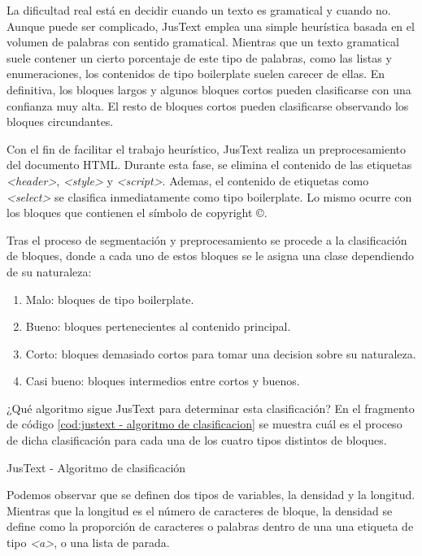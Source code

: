 La dificultad real está en decidir cuando un texto es gramatical y cuando no. Aunque puede ser complicado,
JusText emplea una simple heurística basada en el volumen de palabras con sentido gramatical. Mientras que
un texto gramatical suele contener un cierto porcentaje de este tipo de palabras, como las listas y
enumeraciones, los contenidos de tipo boilerplate suelen carecer de ellas. En definitiva, los bloques
largos y algunos bloques cortos pueden clasificarse con una confianza muy alta. El resto de bloques cortos
pueden clasificarse observando los bloques circundantes.

Con el fin de facilitar el trabajo heurístico, JusText realiza un preprocesamiento del documento HTML. 
Durante esta fase, se elimina el contenido de las etiquetas \emph{<header>}, \emph{<style>} y \emph{<script>}. 
Ademas, el contenido de etiquetas como \emph{<select>} se clasifica inmediatamente como tipo boilerplate. 
Lo mismo ocurre con los bloques que contienen el símbolo de copyright ©.

Tras el proceso de segmentación y preprocesamiento se procede a la clasificación de bloques, donde a cada
uno de estos bloques se le asigna una clase dependiendo de su naturaleza:

\begin{enumerate}
  \item Malo: bloques de tipo boilerplate.
  \item Bueno: bloques pertenecientes al contenido principal.
  \item Corto: bloques demasiado cortos para tomar una decision sobre su naturaleza.
  \item Casi bueno: bloques intermedios entre cortos y buenos.
\end{enumerate}

¿Qué algoritmo sigue JusText para determinar esta clasificación? En el fragmento de código
\ref{cod:justext - algoritmo de clasificacion} se muestra cuál es el proceso de dicha clasificación 
para cada una de los cuatro tipos distintos de bloques. 

\begin{codefloat}
  
  \caption{JusText - Algoritmo de clasificación}
  \label{cod:justext - algoritmo de clasificacion}
\end{codefloat}

Podemos observar que se definen dos tipos de variables, la densidad y la longitud. Mientras que la longitud 
es el número de caracteres de bloque, la densidad se define como la proporción de caracteres o palabras 
dentro de una una etiqueta de tipo \emph{<a>}, o una lista de parada.

